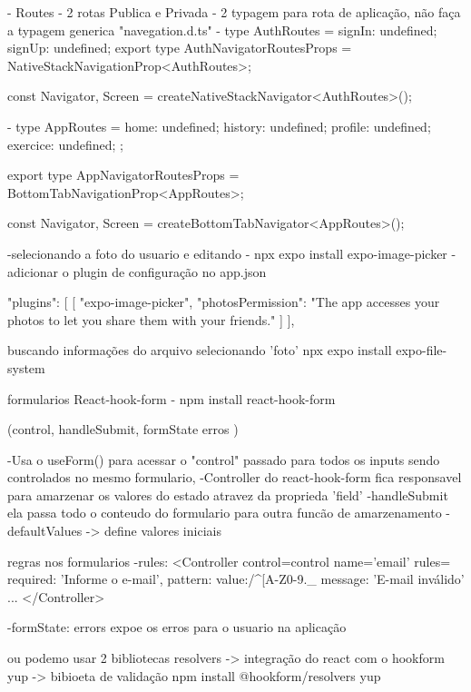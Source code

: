 - Routes
- 2 rotas Publica e Privada
- 2 typagem para rota de aplicação, não faça a typagem generica "navegation.d.ts"
- type AuthRoutes = {
    signIn: undefined;
    signUp: undefined;
}
export type AuthNavigatorRoutesProps = NativeStackNavigationProp<AuthRoutes>;

const { Navigator, Screen } = createNativeStackNavigator<AuthRoutes>();

- type AppRoutes = {
    home: undefined;
    history: undefined;
    profile: undefined;
    exercice: undefined;
};

export type AppNavigatorRoutesProps = BottomTabNavigationProp<AppRoutes>;

const { Navigator, Screen } = createBottomTabNavigator<AppRoutes>();


-selecionando a foto do usuario e editando
- npx expo install expo-image-picker
-adicionar o plugin de configuração no app.json

"plugins": [
      [
        "expo-image-picker",
        {
          "photosPermission": "The app accesses your photos to let you share them with your friends."
        }
      ]
    ],

buscando informações do arquivo selecionando 'foto'
npx expo install expo-file-system


formularios
React-hook-form
- npm install react-hook-form

(control, handleSubmit, formState {erros })

-Usa o useForm() para acessar o "control" passado para todos os inputs sendo controlados no mesmo formulario,
-Controller do react-hook-form fica responsavel para amarzenar os valores do estado atravez da proprieda 'field'
-handleSubmit ela passa todo o conteudo do formulario para outra funcão de amarzenamento
-defaultValues -> define valores iniciais


regras nos formularios
-rules:
<Controller
                        control={control}
                        name='email'
                        rules={{
                            required: 'Informe o e-mail',
                            pattern: {
                                value:/^[A-Z0-9._%
                                message: 'E-mail inválido'
                              }
                        }}
...
</Controller>                        

-formState: { errors } expoe os erros para o usuario na aplicação

ou podemo usar 2 bibliotecas 
resolvers -> integração do react com o hookform
yup -> bibioeta de validação
npm install @hookform/resolvers yup


